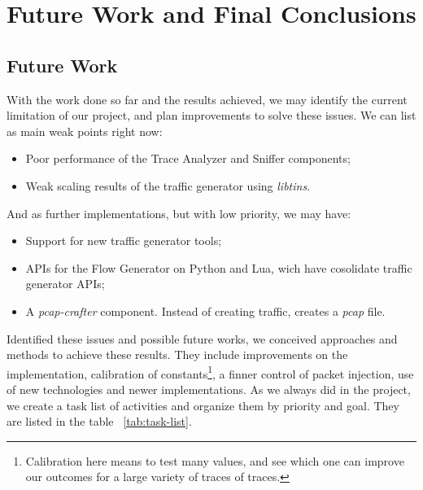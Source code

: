\chapter{Future Work and Final Conclusions}\label{ch:conclusion}


\section{Future Work}

With the work done so far and the results achieved, we may identify the current limitation of our project, and plan improvements to solve these issues. 
We can list as  main weak points right now:

\begin{itemize}
	\item Poor performance of the Trace Analyzer and Sniffer components;
	\item Weak scaling results of the traffic generator using \textit{libtins}.
\end{itemize}

And as further implementations, but with low priority, we may have:

\begin{itemize}
	\item Support for new traffic generator tools;
	\item APIs for the Flow Generator on  Python and Lua, wich have cosolidate traffic generator APIs;
	\item A \textit{pcap-crafter} component. Instead of creating traffic, creates a \textit{pcap} file.
\end{itemize}

Identified these issues and possible future works, we conceived approaches and methods to achieve these results. They include improvements on the implementation,  calibration of constants\footnote{Calibration here means to test many values, and see which one can improve our outcomes for a large variety of traces of traces.}, a finner control of packet injection, use of new technologies and newer implementations. As we always did in the project, we create a task list of activities and organize them by priority and goal. They are listed in the table ~\ref{tab:task-list}.  


